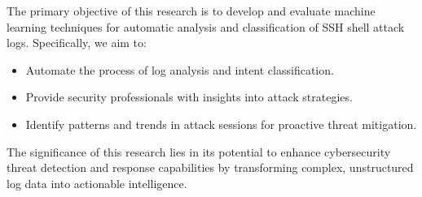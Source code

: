         The primary objective of this research is to develop and evaluate machine learning techniques for automatic analysis and classification of SSH shell attack logs. Specifically, we aim to:
        
        \begin{itemize}
            \item Automate the process of log analysis and intent classification.
            \item Provide security professionals with insights into attack strategies.
            \item Identify patterns and trends in attack sessions for proactive threat mitigation.
        \end{itemize}
        
        The significance of this research lies in its potential to enhance cybersecurity threat detection and response capabilities by transforming complex, unstructured log data into actionable intelligence.
